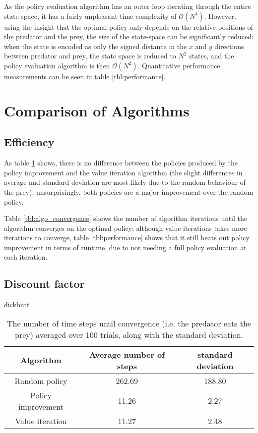 \documentclass[a4paper, 12pt]{article}
\begin{document}
As the policy evaluation algorithm has an outer loop iterating through the
entire state-space, it has a fairly unpleasant time complexity of
$\mathcal{O}(N^4)$. However, using the insight that the optimal policy only
depends on the relative positions of the predator and the prey, the size of the
state-space can be significantly reduced: when the state is encoded as only the
signed distance in the $x$ and $y$ directions between predator and prey, the
state space is reduced to $N^2$ states, and the policy evaluation algorithm is
then $\mathcal{O}(N^2)$. Quantitative performance measurements can be seen in table
\ref{tbl:performance}.

\section*{Comparison of Algorithms}
\subsection*{Efficiency}
As table \ref{tbl:sim_convergence} shows, there is no difference between the
policies produced by the policy improvement and the value iteration algorithm
(the slight differences in average and standard deviation are most likely due to the random
behaviour of the prey); unsurprisingly, both policies are a major improvement over the
random policy.

Table \ref{tbl:algo_convergence} shows the number of algorithm
iterations until the algorithm converges on the optimal policy; although value
iterations takes more iterations to converge, table \ref{tbl:performance} shows
that it still beats out policy improvement in terms of runtime, due to not
needing a full policy evaluation at each iteration.

\subsection*{Discount factor}
dickbutt

\begin{table}[htb]
	\begin{tabular}{|c|c|c|}
		\hline
		Algorithm & Average number of steps & standard deviation \\
		\hline
		Random policy & 262.69 & 188.80 \\
		Policy improvement & 11.26 & 2.27 \\
		Value iteration & 11.27 & 2.48 \\
		\hline
	\end{tabular}
	\caption{The number of time steps until convergence (i.e. the predator eats
		the prey) averaged over 100 trials, along with the standard deviation.}
	\label{tbl:sim_convergence}
\end{table}
\end{document}

